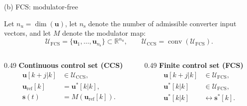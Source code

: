 \begin{frame}
\begin{minipage}[t]{0.49\textwidth}
		(b) FCS: modulator-free
	\end{minipage}\pause%
	\vspace{0.15cm}
	Let $n_u=\dim(\bm{u})$, let $n_\mathrm{s}$ denote the number of admissible converter input vectors, and let $M$ denote the modulator map:
	\begin{equation*}
		\mathcal{U}_\mathrm{FCS}=\{\bm{u}_1,\ldots,\bm{u}_{n_\mathrm{s}}\}\subset\mathbb{R}^{n_u},
		\qquad
		\mathcal{U}_\mathrm{CCS}=\operatorname{conv}(\mathcal{U}_\mathrm{FCS}).
	\end{equation*}\pause%
	\vspace{-0.25cm}
	\begin{columns}[T,totalwidth=\textwidth]
		\begin{column}{0.49\textwidth}
			\centering
			\textbf{Continuous control set (CCS)}
			\begin{equation*}
				\begin{aligned}
					\bm{u}[k+j|k]          & \in\mathcal{U}_\mathrm{CCS}, \\[-0.5mm]
					\bm{u}_\mathrm{ref}[k] & =\bm{u}^*[k|k],              \\[-0.5mm]
					\bm{s}(t)              & =M(\bm{u}_\mathrm{ref}[k]).
				\end{aligned}
			\end{equation*}
		\end{column}
		\begin{column}{0.49\textwidth}
			\centering
			\textbf{Finite control set (FCS)}
			\begin{equation*}
				\begin{aligned}
					\bm{u}[k+j|k] & \in\mathcal{U}_\mathrm{FCS}, \\[-0.5mm]
					\bm{u}^*[k|k] & \in\mathcal{U}_\mathrm{FCS}, \\[-0.5mm]
					\bm{u}^*[k|k] & \leftrightarrow\bm{s}^*[k].
				\end{aligned}
			\end{equation*}
		\end{column}
	\end{columns}
\end{frame}

